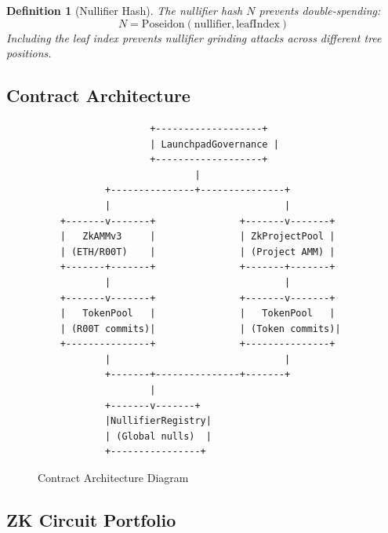 \documentclass[11pt,a4paper]{article}
\newtheorem{definition}[theorem]{Definition}
\begin{document}
\begin{definition}[Nullifier Hash]
The nullifier hash $N$ prevents double-spending:
\begin{equation}
N = \text{Poseidon}(\text{nullifier}, \text{leafIndex})
\end{equation}
Including the leaf index prevents nullifier grinding attacks across different tree positions.
\end{definition}

\subsection{Contract Architecture}

\begin{figure}[H]
\centering
\begin{verbatim}
                    +-------------------+
                    | LaunchpadGovernance |
                    +-------------------+
                            |
            +---------------+---------------+
            |                               |
    +-------v-------+               +-------v-------+
    |   ZkAMMv3     |               | ZkProjectPool |
    | (ETH/R00T)    |               | (Project AMM) |
    +-------+-------+               +-------+-------+
            |                               |
    +-------v-------+               +-------v-------+
    |   TokenPool   |               |   TokenPool   |
    | (R00T commits)|               | (Token commits)|
    +---------------+               +---------------+
            |                               |
            +-------+---------------+-------+
                    |
            +-------v-------+
            |NullifierRegistry|
            | (Global nulls)  |
            +----------------+
\end{verbatim}
\caption{Contract Architecture Diagram}
\end{figure}

\subsection{ZK Circuit Portfolio}
\end{document}
